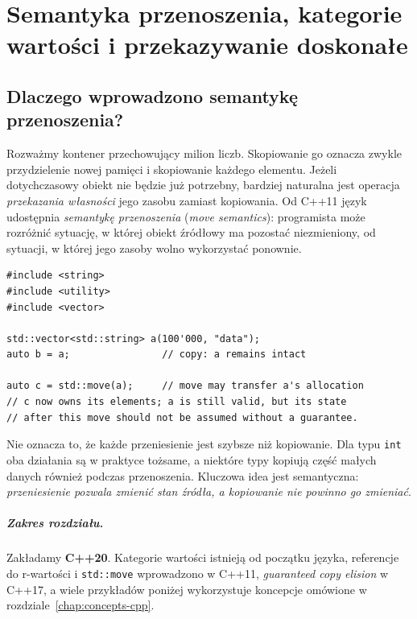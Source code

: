 
\chapter[Semantyka przenoszenia w C++]{Semantyka przenoszenia, kategorie wartości i przekazywanie doskonałe}
\label{chap:move-semantics-cpp}

\section{Dlaczego wprowadzono semantykę przenoszenia?}

Rozważmy kontener przechowujący milion liczb. Skopiowanie go oznacza
zwykle przydzielenie nowej pamięci i skopiowanie każdego elementu.
Jeżeli dotychczasowy obiekt nie będzie już potrzebny, bardziej naturalna
jest operacja \emph{przekazania własności} jego zasobu zamiast kopiowania.
Od C++11 język udostępnia \emph{semantykę przenoszenia} (\textit{move
semantics}): programista może rozróżnić sytuację, w której obiekt źródłowy
ma pozostać niezmieniony, od sytuacji, w której jego zasoby wolno wykorzystać
ponownie.

\begin{lstlisting}
#include <string>
#include <utility>
#include <vector>

std::vector<std::string> a(100'000, "data");
auto b = a;                // copy: a remains intact

auto c = std::move(a);     // move may transfer a's allocation
// c now owns its elements; a is still valid, but its state
// after this move should not be assumed without a guarantee.
\end{lstlisting}

Nie oznacza to, że każde przeniesienie jest szybsze niż kopiowanie.
Dla typu \texttt{int} oba działania są w praktyce tożsame, a niektóre typy
kopiują część małych danych również podczas przenoszenia.
Kluczowa idea jest semantyczna: \emph{przeniesienie pozwala zmienić stan
źródła, a kopiowanie nie powinno go zmieniać}.

\paragraph{Zakres rozdziału.}
Zakładamy \textbf{C++20}. Kategorie wartości istnieją od początku języka,
referencje do r-wartości i \texttt{std::move} wprowadzono w C++11,
\emph{guaranteed copy elision} w C++17, a wiele przykładów poniżej
wykorzystuje koncepcje omówione w rozdziale~\ref{chap:concepts-cpp}.

